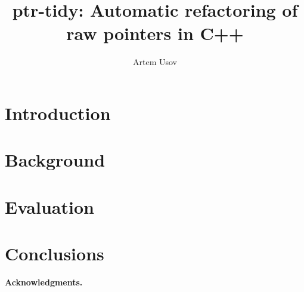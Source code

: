 \documentclass{paper}
\begin{document}
    \title{ptr-tidy: Automatic refactoring of raw pointers in C++}
    \author{Artem Usov}

    \maketitle




    \begin{abstract}
    \end{abstract}




    \section{Introduction}\label{sec:introduction}




    \section{Background}\label{sec:background}




    \section{Evaluation}\label{sec:evaluation}




    \section{Conclusions}\label{sec:conclusions}




    \vskip8pt \noindent
    \textbf{Acknowledgments.}

    
    
\end{document}
